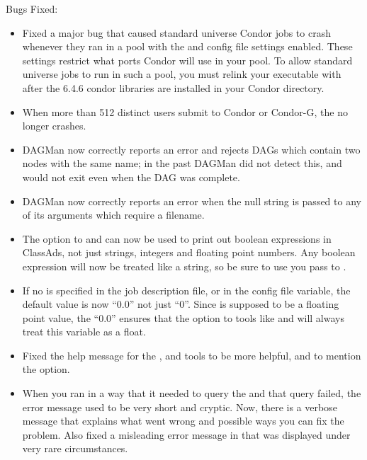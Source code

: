 \noindent Bugs Fixed:
\begin{itemize}

\item Fixed a major bug that caused standard universe Condor jobs to
crash whenever they ran in a pool with the  and
 config file settings enabled.
These settings restrict what ports Condor will use in your pool.
To allow standard universe jobs to run in such a pool, you must relink
your executable with  after the 6.4.6 condor libraries
are installed in your Condor  directory.

\item When more than 512 distinct users submit to Condor or Condor-G,
the  no longer crashes. 

\item DAGMan now correctly reports an error and rejects DAGs
which contain two nodes with the same name; in the past DAGMan
did not detect this, and would not exit even when the DAG was
complete.

\item DAGMan now correctly reports an error when the null string
is passed to any of its arguments which require a filename.

\item The  option to  and  can
now be used to print out boolean expressions in ClassAds, not just
strings, integers and floating point numbers.
Any boolean expression will now be treated like a string, so be sure
to use \verb@%s@ as the conversion character in the formatting string
you pass to .

\item If no  is specified in the job description file, or
in the  config file variable, the default value
is now ``0.0'' not just ``0''.
Since  is supposed to be a floating point value, the
``0.0'' ensures that the  option to tools like 
and  will always treat this variable as a float.

\item Fixed the help message for the ,  and
 tools to be more helpful, and to mention the
 option.

\item When you ran  in a way that it needed to query the
 and that query failed, the error message used to be
very short and cryptic.
Now, there is a verbose message that explains what went wrong and
possible ways you can fix the problem.
Also fixed a misleading error message in  that was
displayed under very rare circumstances.

\end{itemize}

